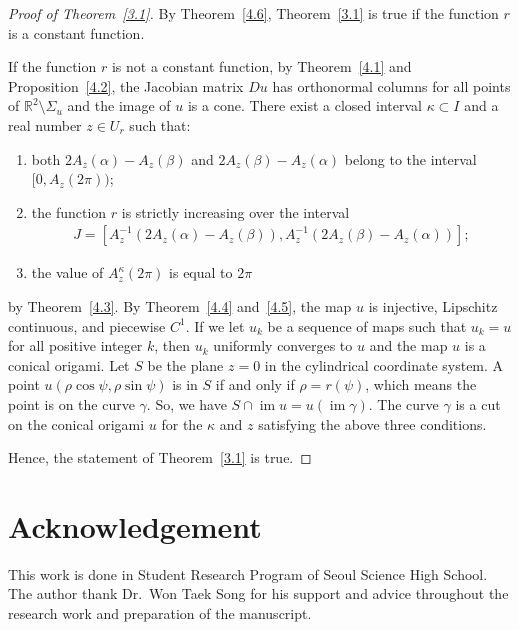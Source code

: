 \documentclass{amsart}
\theoremstyle{plain}
\theoremstyle{definition}
\theoremstyle{remark}
\DeclareMathOperator{\im}{im}
\begin{document}
\begin{proof}[Proof of Theorem~\ref{3.1}]%
By Theorem~\ref{4.6}, Theorem~\ref{3.1} is true if the function $r$ is a constant function.

If the function $r$ is not a constant function,
by Theorem~\ref{4.1} and Proposition~\ref{4.2}, the Jacobian matrix $Du$ has orthonormal columns for all points of $\mathbb{R}^2\setminus\Sigma_u$ and the image of $u$ is a cone.
There exist a closed interval $\kappa\subset I$ and a real number $z\in U_r$ such that:
\begin{enumerate}
\item both $2A_z(\alpha)-A_z(\beta)$ and $2A_z(\beta)-A_z(\alpha)$ belong to the interval $[0,A_z(2\pi))$;
\item the function $r$ is strictly increasing over the interval
\begin{align*}
J=[A_z^{-1}(2A_z(\alpha)-A_z(\beta)),A_z^{-1}(2A_z(\beta)-A_z(\alpha))];
\end{align*}
\item the value of $A_z^{\kappa}(2\pi)$ is equal to $2\pi$
\end{enumerate}
by Theorem~\ref{4.3}.
By Theorem~\ref{4.4} and~\ref{4.5}, the map $u$ is injective, Lipschitz continuous, and piecewise $C^1$.
If we let $u_k$ be a sequence of maps such that $u_k=u$ for all positive integer $k$, then $u_k$ uniformly converges to $u$ and the map $u$ is a conical origami.
Let $S$ be the plane $z=0$ in the cylindrical coordinate system.
A point $u(\rho\cos\psi,\rho\sin\psi)$ is in $S$ if and only if $\rho=r(\psi)$, which means the point is on the curve $\gamma$.
So, we have $S\cap\im u=u(\im\gamma)$.
The curve $\gamma$ is a cut on the conical origami $u$ for the $\kappa$ and $z$ satisfying the above three conditions.

Hence, the statement of Theorem~\ref{3.1} is true.
\end{proof}

\section*{Acknowledgement}
This work is done in Student Research Program of Seoul Science High School. 
The author thank Dr.~Won Taek Song for his support and advice 
throughout the research work and preparation of the manuscript. 




\end{document}
